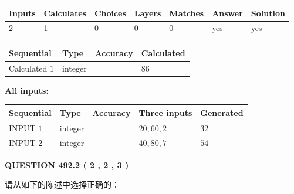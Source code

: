 \documentclass{ctexart}
\begin{document}
 
\noindent{}
 
 

 
   
   
   
   
\noindent\begin{tabular}{|l|l|l|l|l|l|l|}
 \hline
Inputs & Calculates & Choices & Layers & Matches & Answer & Solution \\ \hline
 2  & 
 1  & 
 0
  & 
 0  & 
 0  & 
  yes & 
  yes 
  \\ \hline
 \end{tabular}
   
   
   
   
\noindent{}
   
   
  
  
\noindent\begin{tabular}{|l|l|l|l|}
\hline
 Sequential & Type & Accuracy & Calculated \\ 
\hline
 
 
  Calculated $  1 $ & integer &  & 
  $ 86 $ 
 \\  \hline  
 \end{tabular}
   
   
   
   
\noindent\vspace{0.1in}\hspace{-0.08in} {\textbf{\Large{All inputs: }}}
   
   
  
  
\noindent\begin{tabular}{|l|l|l|l|l|}
\hline
 Sequential & Type & Accuracy & Three inputs & Generated \\ 
\hline
 
 
  INPUT $  1 $ & integer &  & $
 20
 , 
 60
 , 
 2
 $ & $ 32 $ 
 \\  \hline  
 
 
  INPUT $  2 $ & integer &  & $
 40
 , 
 80
 , 
 7
 $ & $ 54 $ 
 \\  \hline  
 \end{tabular}
   
   
  
\vspace{0.2in}
  
{\textbf{\Large{QUESTION
492.2 
 ( 2 , 2 , 3 )
}}}
  
  
请从如下的陈述中选择正确的：
 
\end{document}
